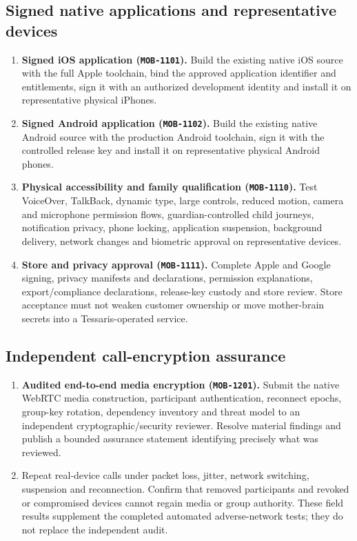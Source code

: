 \subsection{Signed native applications and representative devices}

\begin{enumerate}
  \item \textbf{Signed iOS application (\texttt{MOB-1101}).} Build the existing
  native iOS source with the full Apple toolchain, bind the approved application
  identifier and entitlements, sign it with an authorized development identity and
  install it on representative physical iPhones.

  \item \textbf{Signed Android application (\texttt{MOB-1102}).} Build the existing
  native Android source with the production Android toolchain, sign it with the
  controlled release key and install it on representative physical Android phones.

  \item \textbf{Physical accessibility and family qualification
  (\texttt{MOB-1110}).} Test VoiceOver, TalkBack, dynamic type, large controls,
  reduced motion, camera and microphone permission flows, guardian-controlled child
  journeys, notification privacy, phone locking, application suspension, background
  delivery, network changes and biometric approval on representative devices.

  \item \textbf{Store and privacy approval (\texttt{MOB-1111}).} Complete Apple and
  Google signing, privacy manifests and declarations, permission explanations,
  export/compliance declarations, release-key custody and store review.  Store
  acceptance must not weaken customer ownership or move mother-brain secrets into a
  Tessaris-operated service.
\end{enumerate}

\subsection{Independent call-encryption assurance}

\begin{enumerate}
  \item \textbf{Audited end-to-end media encryption (\texttt{MOB-1201}).} Submit the
  native WebRTC media construction, participant authentication, reconnect epochs,
  group-key rotation, dependency inventory and threat model to an independent
  cryptographic/security reviewer.  Resolve material findings and publish a bounded
  assurance statement identifying precisely what was reviewed.

  \item Repeat real-device calls under packet loss, jitter, network switching,
  suspension and reconnection.  Confirm that removed participants and revoked or
  compromised devices cannot regain media or group authority.  These field results
  supplement the completed automated adverse-network tests; they do not replace the
  independent audit.
\end{enumerate}

